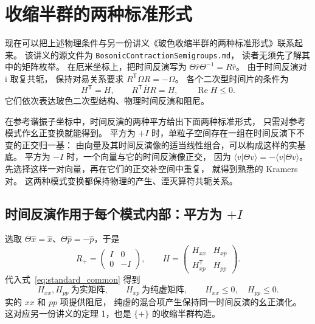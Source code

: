 \documentclass[UTF8,11pt,a4paper,fontset=fandol]{ctexart}
\newcommand{\ii}{\mathrm i}
\newcommand{\trans}{\mathsf T}
\numberwithin{equation}{section}
\begin{document}
\section{收缩半群的两种标准形式}
\label{sec:standard}

现在可以把上述物理条件与另一份讲义《玻色收缩半群的两种标准形式》联系起来。
该讲义的源文件为 \texttt{BosonicContractionSemigroups.md}，
读者无须先了解其中的矩阵枚举。
在厄米坐标上，把时间反演写为
$\Theta\hat r\Theta^{-1}=R\hat r$。
由于时间反演对 $\ii$ 取复共轭，
保持对易关系要求 $R^\trans\Omega R=-\Omega$。
各个二次型时间片的条件为
\begin{equation}
 \boxed{H^\trans=H,\qquad R^\trans\overline H R=H,
 \qquad \operatorname{Re}H\leq0.}
 \label{eq:standard_common}
\end{equation}
它们依次表达玻色二次型结构、物理时间反演和阻尼。

在参考谐振子坐标中，时间反演的两种平方给出下面两种标准形式，
只需对参考模式作幺正变换就能得到。
平方为 $+I$ 时，单粒子空间存在一组在时间反演下不变的正交归一基：
由向量及其时间反演像的适当线性组合，可以构成这样的实基底。
平方为 $-I$ 时，一个向量与它的时间反演像正交，
因为 $\langle v|\Theta v\rangle=-\langle v|\Theta v\rangle$。
先选择这样一对向量，再在它们的正交补空间中重复，
就得到熟悉的 Kramers 对。
这两种模式变换都保持物理的产生、湮灭算符共轭关系。

\subsection{时间反演作用于每个模式内部：平方为 \texorpdfstring{$+I$}{+I}}

选取 $\Theta\hat x=\hat x$、$\Theta\hat p=-\hat p$，于是
\begin{equation}
 R_+=\begin{pmatrix}I&0\\0&-I\end{pmatrix},\qquad
 H=\begin{pmatrix}H_{xx}&H_{xp}\\H_{xp}^\trans&H_{pp}\end{pmatrix}.
\end{equation}
代入式~\eqref{eq:standard_common} 得到
\begin{equation}
 \boxed{H_{xx},H_{pp}\ \text{为实矩阵},\qquad
 H_{xp}\ \text{为纯虚矩阵},\qquad
 H_{xx}\leq0,\quad H_{pp}\leq0.}
 \label{eq:plus_standard}
\end{equation}
实的 $xx$ 和 $pp$ 项提供阻尼，
纯虚的混合项产生保持同一时间反演的幺正演化。
这对应另一份讲义的定理 1，也是 $\{+\}$ 的收缩半群构造。
\end{document}
